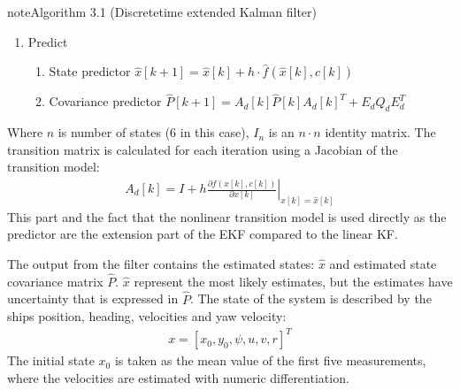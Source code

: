\documentclass[review]{elsarticle}
\begin{document}
\begin{sphinxadmonition}{note}{Algorithm 3.1 (Discrete\sphinxhyphen{}time extended Kalman filter)}
\begin{enumerate}
\begin{enumerate}
\item {} 
\sphinxAtStartPar
Predict
\begin{enumerate}
%
\item {} 
\sphinxAtStartPar
State predictor
\(\hat{x}[k+1] = \hat{x}[k] + h \cdot \hat{f}(\hat{x}[k], c[k])\)

\item {} 
\sphinxAtStartPar
Covariance predictor
\(\hat{P}[k+1] = A_d[k]  \hat{P}[k] A_d[k]^T + E_d Q_d E_d^T \)

\end{enumerate}

\end{enumerate}

\end{enumerate}
\end{sphinxadmonition}

\sphinxAtStartPar
Where \(n\) is number of states (6 in this case), \(I_n\) is an \(n \cdot n\) identity matrix.
The transition matrix is calculated for each iteration using a Jacobian of the transition model:
\begin{equation}\label{equation:04.01_EK:eqjacobi}
\begin{split}A_d[k] = I + h \left. \frac{\partial f \left(x[k],c[k] \right)}{\partial x[k]} \right|_{x[k]=\hat{x}[k]}\end{split}
\end{equation}
\sphinxAtStartPar
This part and the fact that the nonlinear transition model is used directly as the predictor are the extension part of the EKF compared to the linear KF.

\sphinxAtStartPar
The output from the filter contains the estimated states: \(\hat{x}\) and estimated state covariance matrix \(\hat{P}\). \(\hat{x}\) represent the most likely estimates, but the estimates have uncertainty that is expressed in \(\hat{P}\).
The state of the system is described by the ships position, heading, velocities and yaw velocity:
\begin{equation}\label{equation:04.01_EK:eqstates}
\begin{split}x = [x_0,y_0,\psi,u,v,r]^T\end{split}
\end{equation}
\sphinxAtStartPar
The initial state \(x_0\) is taken as the mean value of the first five measurements, where the velocities are estimated with numeric differentiation.
\end{document}
